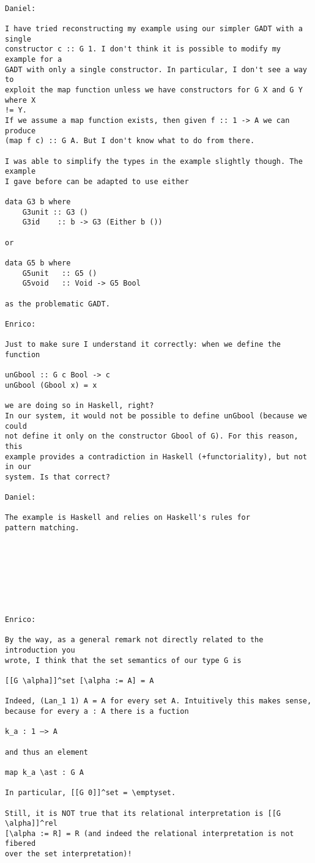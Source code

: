 \documentclass[acmsmall,screen,review,anonymous]{acmart}
\theoremstyle{definition}
\begin{document}
\begin{verbatim}
  
Daniel:

I have tried reconstructing my example using our simpler GADT with a single
constructor c :: G 1. I don't think it is possible to modify my example for a
GADT with only a single constructor. In particular, I don't see a way to
exploit the map function unless we have constructors for G X and G Y where X
!= Y.
If we assume a map function exists, then given f :: 1 -> A we can produce
(map f c) :: G A. But I don't know what to do from there.

I was able to simplify the types in the example slightly though. The example
I gave before can be adapted to use either

data G3 b where
    G3unit :: G3 ()
    G3id    :: b -> G3 (Either b ())

or

data G5 b where
    G5unit   :: G5 ()
    G5void   :: Void -> G5 Bool

as the problematic GADT.

Enrico:

Just to make sure I understand it correctly: when we define the function

unGbool :: G c Bool -> c
unGbool (Gbool x) = x

we are doing so in Haskell, right?
In our system, it would not be possible to define unGbool (because we could
not define it only on the constructor Gbool of G). For this reason, this
example provides a contradiction in Haskell (+functoriality), but not in our
system. Is that correct?

Daniel:

The example is Haskell and relies on Haskell's rules for
pattern matching.








Enrico:

By the way, as a general remark not directly related to the introduction you
wrote, I think that the set semantics of our type G is

[[G \alpha]]^set [\alpha := A] = A

Indeed, (Lan_1 1) A = A for every set A. Intuitively this makes sense,
because for every a : A there is a fuction

k_a : 1 —> A

and thus an element

map k_a \ast : G A

In particular, [[G 0]]^set = \emptyset.

Still, it is NOT true that its relational interpretation is [[G \alpha]]^rel
[\alpha := R] = R (and indeed the relational interpretation is not fibered
over the set interpretation)!
\end{verbatim}
\end{document}
